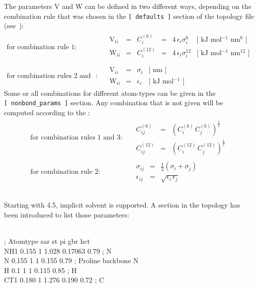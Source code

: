 The parameters V and W can be defined in two different ways, depending on
the combination rule that was chosen in the {\tt [~defaults~]} section
of the topology file (see~):
\begin{eqnarray}
\mbox{for combination rule 1}: & &
\begin{array}{llllll}
  \mbox{V}_{ii} & = & C^{(6)}_{i}  & = & 4\,\epsilon_i\sigma_i^{6} &
  \mbox{[ kJ mol$^{-1}$ nm$^{6}$ ]}\\
  \mbox{W}_{ii} & = & C^{(12)}_{i} & = & 4\,\epsilon_i\sigma_i^{12} &
  \mbox{[ kJ mol$^{-1}$ nm$^{12}$ ]}\\
\end{array}
\\
\mbox{for combination rules 2 and 3}: & &
\begin{array}{llll}
  \mbox{V}_{ii} & = & \sigma_i   & \mbox{[ nm ]} \\
  \mbox{W}_{ii} & = & \epsilon_i & \mbox{[ kJ mol$^{-1}$ ]}
\end{array}
\end{eqnarray}
Some or all combinations for different atom-types can be given in
the {\tt [~nonbond\_params~]} section. Any combination that is
not given will be 
computed according to the :
\begin{eqnarray}
\mbox{for combination rules 1 and 3}: & &
\begin{array}{lll}
  C^{(6)}_{ij}  & = & \left(C^{(6)}_i\,C^{(6)}_j\right)^{\frac{1}{2}} \\
  C^{(12)}_{ij} & = & \left(C^{(12)}_i\,C^{(12)}_j\right)^{\frac{1}{2}}
\end{array}
\\
\mbox{for combination rule 2}: & &
\begin{array}{lll}
  \sigma_{ij}   & = & \frac{1}{2}(\sigma_i+\sigma_j) \\
  \epsilon_{ij} & = & \sqrt{\epsilon_i\,\epsilon_j}
\end{array}
\end{eqnarray}

\subsection{}
Starting with {\gromacs} 4.5, implicit solvent is supported. A section in the
topology has been introduced to list those parameters:

\begin{tt}
 \\
; Atomtype  sar  st   pi      gbr      hct \\
NH1       0.155  1   1.028   0.17063  0.79 ; N \\
N         0.155  1   1       0.155    0.79 ; Proline backbone N \\
H         0.1    1   1       0.115    0.85 ; H \\
CT1       0.180  1   1.276   0.190    0.72 ; C \\
\end{tt}

